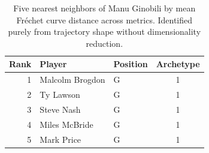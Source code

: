 \begin{table}[htbp]
  \centering\small
  \begin{tabular}{rllc}
    \toprule
    Rank & Player & Position & Archetype \\
    \midrule
    1 & Malcolm Brogdon & G & 1 \\
    2 & Ty Lawson & G & 1 \\
    3 & Steve Nash & G & 1 \\
    4 & Miles McBride & G & 1 \\
    5 & Mark Price & G & 1 \\
    \bottomrule
  \end{tabular}
  \caption{Five nearest neighbors of Manu Ginobili by mean Fr\'{e}chet curve distance across metrics. Identified purely from trajectory shape without dimensionality reduction.}
  \label{tab:Manu_Ginobili_frechet_curve_neighbors}
\end{table}

